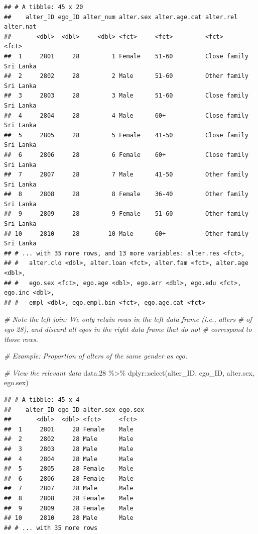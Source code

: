 \documentclass[
]{book}
\newenvironment{Shaded}{\begin{snugshade}}{\end{snugshade}}
\newcommand{\CommentTok}[1]{\textcolor[rgb]{0.56,0.35,0.01}{\textit{#1}}}
\newcommand{\FloatTok}[1]{\textcolor[rgb]{0.00,0.00,0.81}{#1}}
\newcommand{\FunctionTok}[1]{\textcolor[rgb]{0.00,0.00,0.00}{#1}}
\newcommand{\NormalTok}[1]{#1}
\newcommand{\SpecialCharTok}[1]{\textcolor[rgb]{0.00,0.00,0.00}{#1}}
\begin{document}
\begin{verbatim}
## # A tibble: 45 x 20
##    alter_ID ego_ID alter_num alter.sex alter.age.cat alter.rel    alter.nat
##       <dbl>  <dbl>     <dbl> <fct>     <fct>         <fct>        <fct>    
##  1     2801     28         1 Female    51-60         Close family Sri Lanka
##  2     2802     28         2 Male      51-60         Other family Sri Lanka
##  3     2803     28         3 Male      51-60         Close family Sri Lanka
##  4     2804     28         4 Male      60+           Close family Sri Lanka
##  5     2805     28         5 Female    41-50         Close family Sri Lanka
##  6     2806     28         6 Female    60+           Close family Sri Lanka
##  7     2807     28         7 Male      41-50         Other family Sri Lanka
##  8     2808     28         8 Female    36-40         Other family Sri Lanka
##  9     2809     28         9 Female    51-60         Other family Sri Lanka
## 10     2810     28        10 Male      60+           Other family Sri Lanka
## # ... with 35 more rows, and 13 more variables: alter.res <fct>,
## #   alter.clo <dbl>, alter.loan <fct>, alter.fam <fct>, alter.age <dbl>,
## #   ego.sex <fct>, ego.age <dbl>, ego.arr <dbl>, ego.edu <fct>, ego.inc <dbl>,
## #   empl <dbl>, ego.empl.bin <fct>, ego.age.cat <fct>
\end{verbatim}

\begin{Shaded}
\begin{Highlighting}[]
\CommentTok{\# Note the left join: We only retain rows in the left data frame (i.e., alters}
\CommentTok{\# of ego 28), and discard all egos in the right data frame that do not}
\CommentTok{\# correspond to those rows.}

\CommentTok{\# Example: Proportion of alters of the same gender as ego.}

\CommentTok{\# View the relevant data}
\NormalTok{data}\FloatTok{.28} \SpecialCharTok{\%\textgreater{}\%} 
\NormalTok{  dplyr}\SpecialCharTok{::}\FunctionTok{select}\NormalTok{(alter\_ID, ego\_ID, alter.sex, ego.sex)}
\end{Highlighting}
\end{Shaded}

\begin{verbatim}
## # A tibble: 45 x 4
##    alter_ID ego_ID alter.sex ego.sex
##       <dbl>  <dbl> <fct>     <fct>  
##  1     2801     28 Female    Male   
##  2     2802     28 Male      Male   
##  3     2803     28 Male      Male   
##  4     2804     28 Male      Male   
##  5     2805     28 Female    Male   
##  6     2806     28 Female    Male   
##  7     2807     28 Male      Male   
##  8     2808     28 Female    Male   
##  9     2809     28 Female    Male   
## 10     2810     28 Male      Male   
## # ... with 35 more rows
\end{verbatim}
\end{document}
